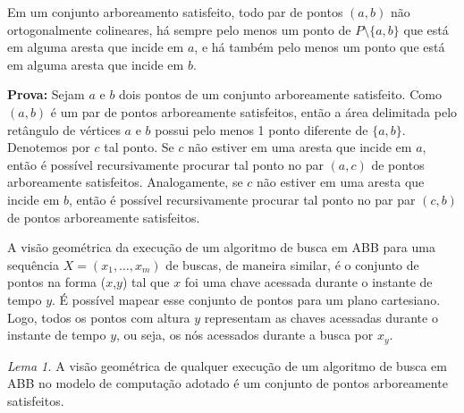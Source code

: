
Em um conjunto arboreamento satisfeito, todo par de pontos $(a,b)$ não ortogonalmente colineares, há sempre pelo menos um ponto de \( P \setminus \{a,b\} \) que está em alguma aresta que incide em $a$, e há também pelo menos um ponto que está em alguma aresta que incide em $b$.

\begin{center}
\end{center}

\textbf{Prova:} Sejam $a$ e $b$ dois pontos de um conjunto arboreamente satisfeito. Como $(a,b)$ é um par de pontos arboreamente satisfeitos, então a área delimitada pelo retângulo de vértices $a$ e $b$ possui pelo menos 1 ponto diferente de $\{a,b\}$. Denotemos por $c$ tal ponto. Se $c$ não estiver em uma aresta que incide em $a$, então é possível recursivamente procurar tal ponto no par $(a,c)$ de pontos arboreamente satisfeitos. Analogamente, se $c$ não estiver em uma aresta que incide em $b$, então é possível recursivamente procurar tal ponto no par par $(c,b)$ de pontos arboreamente satisfeitos.


A visão geométrica da execução de um algoritmo de busca em ABB para uma sequência $X = (x_{1},\ldots,x_{m})$ de buscas, de maneira similar, é o conjunto de pontos na forma ($x$,$y$) tal que $x$ foi uma chave acessada durante o instante de tempo $y$. É possível mapear esse conjunto de pontos para um plano cartesiano. Logo, todos os pontos com altura $y$ representam as chaves acessadas durante o instante de tempo $y$, ou seja, os nós acessados durante a busca por $x_y$. 

\textit{Lema 1.} A visão geométrica de qualquer execução de um algoritmo de busca em ABB no modelo de computação adotado é um conjunto de pontos arboreamente satisfeitos.

